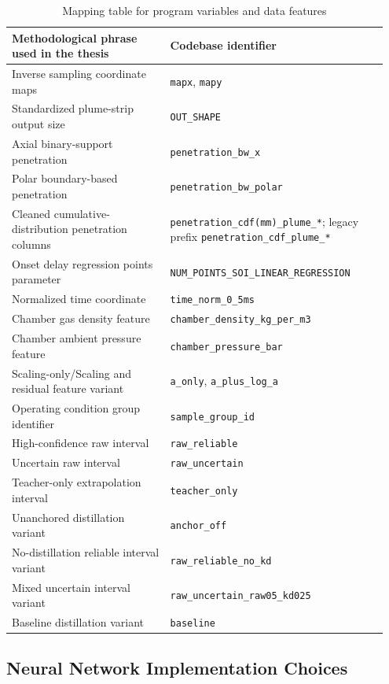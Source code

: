 \begin{table}[!ht]
\centering
\footnotesize
\begin{tabular}{p{0.4\linewidth} p{0.55\linewidth}}
\toprule
\textbf{Methodological phrase used in the thesis} & \textbf{Codebase identifier} \\
\midrule
Inverse sampling coordinate maps & \texttt{mapx}, \texttt{mapy} \\
Standardized plume-strip output size & \texttt{OUT\_SHAPE} \\
Axial binary-support penetration & \texttt{penetration\_bw\_x} \\
Polar boundary-based penetration & \texttt{penetration\_bw\_polar} \\
Cleaned cumulative-distribution penetration columns & \texttt{penetration\_cdf(mm)\_plume\_*}; legacy prefix \texttt{penetration\_cdf\_plume\_*} \\
Onset delay regression points parameter & \texttt{NUM\_POINTS\_SOI\_LINEAR\_REGRESSION} \\
Normalized time coordinate & \texttt{time\_norm\_0\_5ms} \\
Chamber gas density feature & \texttt{chamber\_density\_kg\_per\_m3} \\
Chamber ambient pressure feature & \texttt{chamber\_pressure\_bar} \\
Scaling-only/Scaling and residual feature variant & \texttt{a\_only}, \texttt{a\_plus\_log\_a} \\
Operating condition group identifier & \texttt{sample\_group\_id} \\
High-confidence raw interval & \texttt{raw\_reliable} \\
Uncertain raw interval & \texttt{raw\_uncertain} \\
Teacher-only extrapolation interval & \texttt{teacher\_only} \\
Unanchored distillation variant & \texttt{anchor\_off} \\
No-distillation reliable interval variant & \texttt{raw\_reliable\_no\_kd} \\
Mixed uncertain interval variant & \texttt{raw\_uncertain\_raw05\_kd025} \\
Baseline distillation variant & \texttt{baseline} \\
\bottomrule
\end{tabular}
\caption{Mapping table for program variables and data features}
\end{table}
\FloatBarrier

\subsection{Neural Network Implementation Choices}
\label{app:nn-implementation-mapping}

